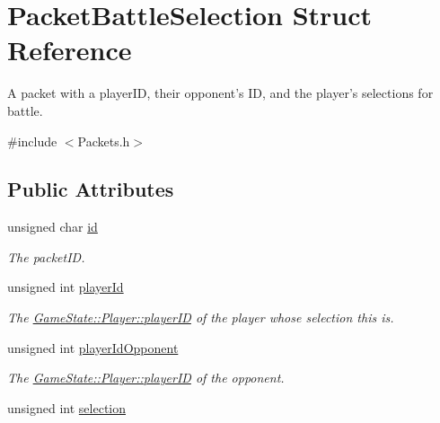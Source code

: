 \hypertarget{struct_packet_battle_selection}{\section{Packet\-Battle\-Selection Struct Reference}
\label{struct_packet_battle_selection}
}


A packet with a player\-I\-D, their opponent's I\-D, and the player's selections for battle.  




{\ttfamily \#include $<$Packets.\-h$>$}

\subsection*{Public Attributes}
\begin{DoxyCompactItemize}
\item 
\hypertarget{struct_packet_battle_selection_ad9d05ea40a225c467a8b88893f9936af}{unsigned char \hyperlink{struct_packet_battle_selection_ad9d05ea40a225c467a8b88893f9936af}{id}}\label{struct_packet_battle_selection_ad9d05ea40a225c467a8b88893f9936af}

\begin{DoxyCompactList}\small\item\em The packet\-I\-D. \end{DoxyCompactList}\item 
\hypertarget{struct_packet_battle_selection_a767bb8ef07ff0e11ef9a248be56818e1}{unsigned int \hyperlink{struct_packet_battle_selection_a767bb8ef07ff0e11ef9a248be56818e1}{player\-Id}}\label{struct_packet_battle_selection_a767bb8ef07ff0e11ef9a248be56818e1}

\begin{DoxyCompactList}\small\item\em The \hyperlink{class_game_state_1_1_player_acbd28d89e6eb8611aa66452ec31e9133}{Game\-State\-::\-Player\-::player\-I\-D} of the player whose selection this is. \end{DoxyCompactList}\item 
\hypertarget{struct_packet_battle_selection_a7822f759fa2277fdae4d2e53850c4748}{unsigned int \hyperlink{struct_packet_battle_selection_a7822f759fa2277fdae4d2e53850c4748}{player\-Id\-Opponent}}\label{struct_packet_battle_selection_a7822f759fa2277fdae4d2e53850c4748}

\begin{DoxyCompactList}\small\item\em The \hyperlink{class_game_state_1_1_player_acbd28d89e6eb8611aa66452ec31e9133}{Game\-State\-::\-Player\-::player\-I\-D} of the opponent. \end{DoxyCompactList}\item 
\hypertarget{struct_packet_battle_selection_a39d44bbd7a4520259ef8d5133ccc5a83}{unsigned int \hyperlink{struct_packet_battle_selection_a39d44bbd7a4520259ef8d5133ccc5a83}{selection}}\label{struct_packet_battle_selection_a39d44bbd7a4520259ef8d5133ccc5a83}


\end{DoxyCompactItemize}
